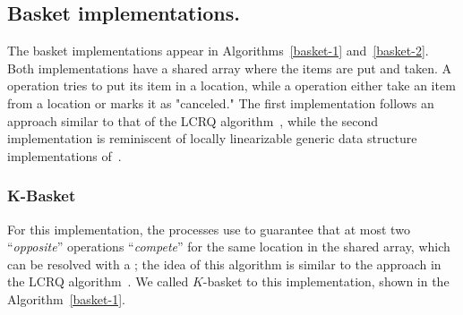 


\subsection{\label{subsec:basket-implementation}Basket implementations.}
The basket implementations appear in Algorithms~\ref{basket-1} and~\ref{basket-2}. Both implementations have a shared array where the items are put and taken. A \Put operation tries to put its item in a location, while a \Take operation either take an item from a location or marks it as "canceled."  The first implementation follows an approach similar to that of the LCRQ algorithm~\cite{ppopp2013x86queues}, while the second implementation is reminiscent of locally linearizable generic data structure implementations of~\cite{DBLP_conf_concur_HaasHHKLPSSV16}.

\subsubsection{K-Basket}

For this implementation, the processes use \FAI to guarantee that at most two ``\textit{opposite}'' operations ``\textit{compete}'' for the same location in the shared array, which can be resolved with a \SWAP; the idea of this algorithm is similar to the approach in the LCRQ algorithm~\cite{ppopp2013x86queues}. We called \(K\)-basket to this implementation, shown in the Algorithm~\ref{basket-1}.



